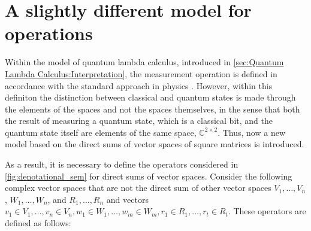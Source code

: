 





\section{A slightly different model for operations}


Within the model of quantum lambda calculus, introduced in \autoref{sec:Quantum Lambda Calculus:Interpretation}, the measurement operation is defined in accordance with the standard approach in physics \cite{watrous2018theory}. However, within this definiton the distinction between classical and quantum states is made through the elements of the spaces and not the spaces themselves, in the sense that both the result of measuring a quantum state, which is a classical bit, and the quantum state itself are elements of the same space, $\mathbb{C}^{2 \times 2}$. Thus, now a new model based on the direct sums of vector spaces of square matrices is introduced.

As a result, it is necessary to define the operators considered in \autoref{fig:denotational_sem} for direct sums of vector spaces. Consider the following complex vector spaces that are not the direct sum of other vector spaces  $V_1, \ldots, V_n$, $W_1, \ldots, W_n$, and $R_1, \ldots, R_n$ and vectors $v_1 \in V_1, \ldots, v_n \in V_n, w_1 \in W_1, \ldots, w_m \in W_m, r_1 \in R_1, \ldots, r_t \in R_t$. These operators are defined as follows:

